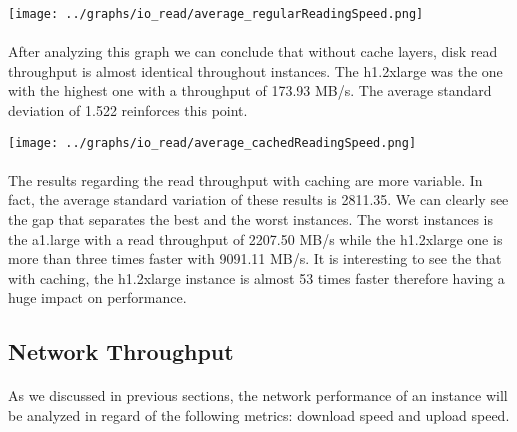 \documentclass[11pt]{article}
\begin{document}
		\begin{center}
		\begin{minipage}{0.6\textwidth}
			 \label{fig:disk_read_throughput_rg_results}
			\texttt{[image: ../graphs/io\_read/average\_regularReadingSpeed.png]}
		\end{minipage}
		\end{center}

		\paragraph{} After analyzing this graph we can conclude that without
		cache layers, disk read throughput is almost identical throughout
		instances. The h1.2xlarge was the one with the highest one with a
		throughput of 173.93 MB/s. The average standard deviation of 1.522
		reinforces this point.

		\begin{center}
			\begin{minipage}{0.6\textwidth}
				 \label{fig:disk_read_throughput_cached_results}
				\texttt{[image: ../graphs/io\_read/average\_cachedReadingSpeed.png]}
			\end{minipage}
		\end{center}

		\paragraph{} The results regarding the read throughput with caching
		are more variable. In fact, the average standard variation of
		these results is 2811.35. We can clearly see the gap that separates
		the best and the worst instances. The worst instances is the
		a1.large with a read throughput of 2207.50 MB/s  while the h1.2xlarge
		one is more than three times faster with 9091.11 MB/s.  It is
		interesting to see the that with caching, the h1.2xlarge instance is
		almost 53 times faster therefore having a huge impact on performance.


	\subsection{Network Throughput}
		\paragraph{} As we discussed in previous sections, the network
		performance of an instance will be analyzed in regard of the following
		metrics: download speed and upload speed.
\end{document}
